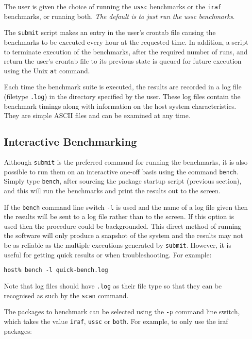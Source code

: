 \begin{enumerate}
The user is given the choice of running the {\tt ussc} benchmarks or the
{\tt iraf} benchmarks, or running both. {\em The default is to just run 
the ussc benchmarks}.

The {\tt submit} script makes an entry in the user's crontab file
causing the benchmarks to be executed every hour at the requested time.
In addition, a script to terminate execution of the benchmarks, after
the required number of runs, and return the user's crontab file to its
previous state is queued for future execution using the Unix {\tt at}
command.

Each time the benchmark suite is executed, the results are recorded in
a log file (filetype {\tt .log}) in the directory specified by the
user. These log files contain the benchmark timings along with
information on the host system characteristics. They are simple ASCII
files and can be examined at any time.


\end{enumerate}

\subsection{Interactive Benchmarking}

Although {\tt submit} is the preferred command for running the benchmarks,
it is also possible to run them on an interactive one-off basis 
using the command {\tt bench}. Simply type {\tt bench}, after sourcing the
package startup script (previous section), and this will run the benchmarks
and print the results out to the screen. 

If the {\tt bench} command line switch {\tt -l} is used and the name of
a log file given then the results will be sent to a log file rather
than to the screen. If this option is used then the procedure could be
backgrounded. This direct method of running the software will only
produce a snapshot of the system and the results may not be as reliable
as the multiple executions generated by {\tt submit}.  However, it is
useful for getting quick results or when troubleshooting.  For
example:

{\tt host\% bench -l quick-bench.log}

Note that log files should have {\tt .log} as their file type so that they
can be recognised as such by the {\tt scan} command.

The packages to benchmark can be selected using the {\tt -p} command line
switch, which takes the value {\tt iraf}, {\tt ussc} or {\tt both}. For
example, to only use the iraf packages:

